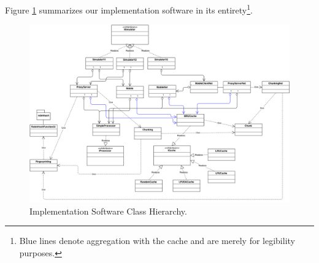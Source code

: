 Figure \ref{fig:class_diagram} summarizes our implementation software in its entirety\footnote{Blue lines denote aggregation with the cache and are merely for legibility purposes.}.

\begin{figure}[ht] \centering \includegraphics[scale=0.40]{images/class_diagram.png}
\caption{Implementation Software Class Hierarchy.}
\label{fig:class_diagram}
\end{figure}




